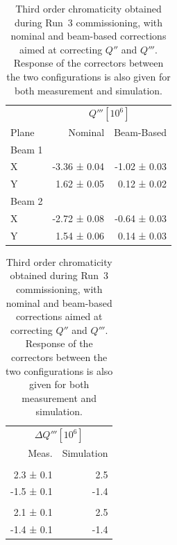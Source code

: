 \begin{table}[!htb]
    \centering
    \begin{minipage}{0.45\linewidth}
        \centering
        \begin{tabular}{lrr}
          \toprule
                  &  \multicolumn{2}{c}{$Q''' [10^6]$}  \\
            Plane & Nominal & Beam-Based \\
          \midrule
            Beam 1    &   & \\
            \hspace{2mm}X     &  -3.36 ± 0.04 &  -1.02 ± 0.03 \\
            \hspace{2mm}Y     &   1.62 ± 0.05 &   0.12 ± 0.02 \\
            Beam 2    &           &               \\
            \hspace{2mm}X     &  -2.72 ± 0.08 &  -0.64 ± 0.03 \\
            \hspace{2mm}Y     &   1.54 ± 0.06 &   0.14 ± 0.03 \\
            \bottomrule
        \end{tabular}
    \end{minipage}%
    \hspace{1cm} %
    \begin{minipage}{0.45\linewidth}
        \centering
        \begin{tabular}{rr}
          \toprule
          \multicolumn{2}{c}{$\Delta Q''' [10^6]$}\\
          Meas.   & Simulation \\
          \midrule
          & \\
          2.3 ± 0.1 &   2.5 \\
          -1.5 ± 0.1 &  -1.4 \\
          &  \\
          2.1 ± 0.1  &  2.5\\
          -1.4 ± 0.1 & -1.4\\
          \bottomrule
        \end{tabular}
    \end{minipage}
    \caption{Third order chromaticity obtained during Run~3 commissioning, with nominal and
             beam-based corrections aimed at correcting $Q''$ and $Q'''$. Response of the correctors
             between the two configurations is also given for both measurement and simulation.}
    \label{table:decapoles:chromaticity:dq3_before_after_beam_based}
\end{table}
  

